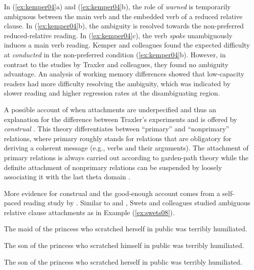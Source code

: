 \documentclass{cambridge7A}\usepackage[]{graphicx}\usepackage[]{color}
\begin{document}
In (\ref{ex:kemper04}a) and (\ref{ex:kemper04}b), the role of \textit{warned} is temporarily ambiguous between the main verb and the embedded verb of a reduced relative clause. In (\ref{ex:kemper04}b), the ambiguity is resolved towards the non-preferred reduced-relative reading. In (\ref{ex:kemper04}c), the verb \textit{spoke} unambiguously induces a main verb reading. Kemper and colleagues found the expected difficulty at \textit{conducted} in the non-preferred condition (\ref{ex:kemper04}b). However, in contrast to the studies by Traxler and colleagues, they found no ambiguity advantage. An analysis of working memory differences showed that low-capacity readers had more difficulty resolving the ambiguity, which was indicated by slower reading and higher regression rates at the disambiguating region.



A possible account of when attachments are underpecified and thus an explanation for the difference between Traxler's experiments and \cite{KemperCrowKemtes2004} is offered by \emph{construal} \citep{CarreirasClifton1993,FrazierClifton1997}. This theory differentiates between ``primary'' and ``nonprimary'' relations, where primary roughly stands for relations that are obligatory for deriving a coherent message (e.g., verbs and their arguments). The attachment of primary relations is always carried out according to garden-path theory \citep{Frazier1987} while the definite attachment of nonprimary relations can be suspended by loosely associating it with the last theta domain \citep{FrazierClifton1997}.




More evidence for construal and the good-enough account \citep{FerreiraFerraroBailey2002,SanfordSturt2002} comes from a self-paced reading study by \cite{SwetsDesmetClifton2008}. Similar to \cite{TraxlerPickeringClifton1998} and \cite{Traxler2007}, Swets and colleagues studied ambiguous relative clause attachments as in Example (\ref{ex:swets08}).

\begin{exe}
\ex\label{ex:swets08}
\begin{xlist}
\item The maid of the princess who scratched herself in public was terribly humiliated.
\item The son of the princess who scratched himself in public was terribly humiliated.
\item The son of the princess who scratched herself in public was terribly humiliated.
\end{xlist}
\end{exe}
\end{document}
